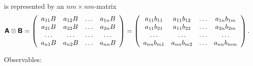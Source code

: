 {is represented by an $nm\times nm$-matrix
\begin{equation}
\textsf{\textbf{A}}\otimes \textsf{\textbf{B}}
=
\left(
\begin{array}{cccccccccc}
a_{11} B& a_{12} B& \ldots & a_{1n}B \\
a_{21} B& a_{22} B& \ldots & a_{2n}B \\
\ldots & \ldots & \ldots & \ldots \\
a_{n1} B& a_{n2} B& \ldots & a_{nn}B
\end{array}
\right)
=
\left(
\begin{array}{cccccccccc}
a_{11} b_{11}& a_{11} b_{12} & \ldots & a_{1n}b_{1m} \\
a_{11} b_{21}& a_{11} b_{22}& \ldots & a_{2n} b_{2m}\\
\ldots & \ldots & \ldots & \ldots \\
a_{nn} b_{m1}& a_{nn} b_{m2}& \ldots & a_{nn} b_{mm}
\end{array}
\right)
.
\end{equation}

{Observables:}

}

